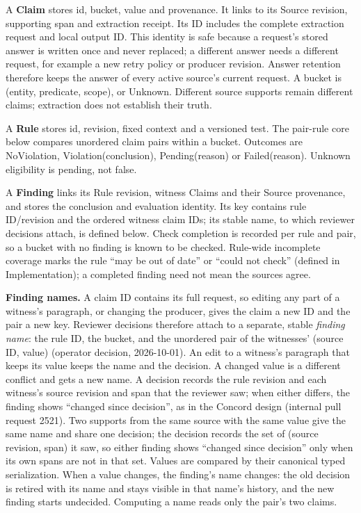 \documentclass[11pt]{article}
\begin{document}
A \textbf{Claim} stores id, bucket, value and provenance. It links to its Source
revision, supporting span and extraction receipt. Its ID includes the complete
extraction request and local output ID. This identity is safe because a
request's stored answer is written once and never replaced; a different answer
needs a different request, for example a new retry policy or producer
revision. Answer retention therefore keeps the answer of every active source's
current request. A bucket is (entity, predicate, scope),
or Unknown. Different source supports remain different claims; extraction does
not establish their truth.

A \textbf{Rule} stores id, revision, fixed context and a versioned test. The
pair-rule core below compares unordered claim pairs within a bucket. Outcomes
are NoViolation, Violation(conclusion), Pending(reason) or Failed(reason).
Unknown eligibility is pending, not false.

A \textbf{Finding} links its Rule revision, witness Claims and their Source
provenance, and stores the conclusion and evaluation identity. Its key contains
rule ID/revision and the ordered witness claim IDs; its stable name, to which
reviewer decisions attach, is defined below. Check completion is recorded per
rule and pair, so a bucket with no finding is known to be checked. Rule-wide incomplete
coverage marks the rule ``may be out of date'' or ``could not check'' (defined
in Implementation); a completed finding need not mean the
sources agree.

\textbf{Finding names.} A claim ID contains its full request, so editing any
part of a witness's paragraph, or changing the producer, gives the claim a new
ID and the pair a new key. Reviewer decisions therefore attach to a separate,
stable \emph{finding name}: the rule ID, the bucket, and the unordered pair of
the witnesses' (source ID, value) (operator decision, 2026-10-01). An edit to a
witness's paragraph that keeps its value keeps the name and the decision. A
changed value is a different conflict and gets a new name. A decision records
the rule revision and each witness's source revision and span that the reviewer
saw; when either differs, the finding shows ``changed since decision'', as in
the Concord design (internal pull request 2521). Two
supports from the same source with the same value give the same name and share
one decision; the decision records the set of (source revision, span) it saw,
so either finding shows ``changed since decision'' only when its own spans are
not in that set. Values are compared by their canonical typed serialization.
When a value changes, the finding's name changes: the old decision is retired
with its name and stays visible in that name's history, and the new finding
starts undecided. Computing a name reads only the pair's two claims.
\end{document}
